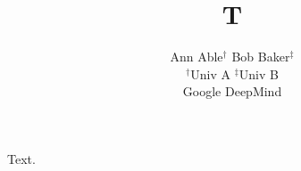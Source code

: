 \documentclass{article}
\title{T}
\author{Ann Able$^{\dagger}$ \quad Bob Baker$^{\ddagger}$ \\ $^\dagger$Univ A \quad $^\ddagger$Univ B \\ Google DeepMind}
\begin{document}
\maketitle
Text.
\end{document}
